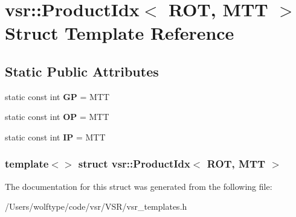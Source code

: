 \hypertarget{structvsr_1_1_product_idx_3_01_r_o_t_00_01_m_t_t_01_4}{\section{vsr\-:\-:Product\-Idx$<$ R\-O\-T, M\-T\-T $>$ Struct Template Reference}
\label{structvsr_1_1_product_idx_3_01_r_o_t_00_01_m_t_t_01_4}
}
\subsection*{Static Public Attributes}
\begin{DoxyCompactItemize}
\item 
\hypertarget{structvsr_1_1_product_idx_3_01_r_o_t_00_01_m_t_t_01_4_af8f964acef7baed49bb406d14197f59b}{static const int {\bfseries G\-P} = M\-T\-T}\label{structvsr_1_1_product_idx_3_01_r_o_t_00_01_m_t_t_01_4_af8f964acef7baed49bb406d14197f59b}

\item 
\hypertarget{structvsr_1_1_product_idx_3_01_r_o_t_00_01_m_t_t_01_4_ad9a2f4e83f072a5053047dcff8b971ee}{static const int {\bfseries O\-P} = M\-T\-T}\label{structvsr_1_1_product_idx_3_01_r_o_t_00_01_m_t_t_01_4_ad9a2f4e83f072a5053047dcff8b971ee}

\item 
\hypertarget{structvsr_1_1_product_idx_3_01_r_o_t_00_01_m_t_t_01_4_a74569a1174711ee73f86754a5657d04e}{static const int {\bfseries I\-P} = M\-T\-T}\label{structvsr_1_1_product_idx_3_01_r_o_t_00_01_m_t_t_01_4_a74569a1174711ee73f86754a5657d04e}

\end{DoxyCompactItemize}
\subsubsection*{template$<$$>$ struct vsr\-::\-Product\-Idx$<$ R\-O\-T, M\-T\-T $>$}



The documentation for this struct was generated from the following file\-:\begin{DoxyCompactItemize}
\item 
/\-Users/wolftype/code/vsr/\-V\-S\-R/vsr\-\_\-templates.\-h\end{DoxyCompactItemize}
